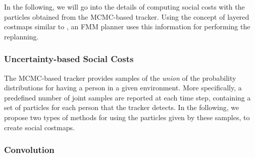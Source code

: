 In the following, we will go into the details of computing social costs with the particles obtained from the MCMC-based tracker. Using the concept of layered costmaps similar to \cite{lu2014iros}, an FMM planner uses this information for performing the replanning.%
\subsubsection{Uncertainty-based Social Costs}

The MCMC-based tracker provides samples of the \textit{union} of the probability distributions for having a person in a given environment. More specifically, a predefined number of joint samples are reported at each time step, containing a set of particles for each person that the tracker detects. In the following, we propose two types of methods for using the particles given by these samples, to create social costmaps.  


\subsubsection*{\normalfont \textbf{Convolution}}

